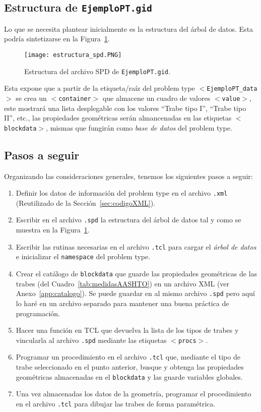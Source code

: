 \documentclass[10pt, a4paper, twocolumn]{article} %
\begin{document}
\subsection{Estructura de \texttt{EjemploPT.gid}}
Lo que se necesita plantear inicialmente es la estructura del árbol de datos. Esta podría sintetizarse en la Figura~\ref{fig:estructura_spd}.

\begin{figure}[hbt!]
	\centering
	\texttt{[image: estructura\_spd.PNG]}
	\caption{Estructura del archivo SPD de \texttt{EjemploPT.gid}.\label{fig:estructura_spd}}
\end{figure}

Esta expone que a partir de la etiqueta/raíz del problem type \texttt{$<$EjemploPT\_data$>$} se crea un \texttt{$<$container$>$} que almacene un cuadro de valores \texttt{$<$value$>$}, este mostrará una lista desplegable con los valores ``Trabe tipo I'', ``Trabe tipo II'', etc., las propiedades geométricas serán almancenadas en las etiquetas \texttt{$<$blockdata$>$}, mismas que fungirán como \textit{base de datos} del problem type.

\subsection{Pasos a seguir}

Organizando las consideraciones generales, tenemos los siguientes pasos a seguir:

\begin{enumerate}
	\item Definir los datos de información del problem type en el archivo \texttt{.xml} (Reutilizado de la Sección~\ref{sec:codigoXML}).
	\item Escribir en el archivo \texttt{.spd} la estructura del árbol de datos tal y como se muestra en la Figura~\ref{fig:estructura_spd}.
	\item Escribir las rutinas necesarias en el archivo \texttt{.tcl} para cargar el \textit{árbol de datos} e inicializar el \texttt{namespace} del problem type.
	\item Crear el catálogo de \texttt{blockdata} que guarde las propiedades geométricas de las trabes (del Cuadro~\ref{tab:medidasAASHTO}) en un archivo XML (ver Anexo~\ref{app:catalogo}). Se puede guardar en al mismo archivo \texttt{.spd} pero aquí lo haré en un archivo separado para mantener una buena práctica de programación.
	\item Hacer una función en TCL que devuelva la lista de los tipos de trabes y vincularla al archivo \texttt{.spd} mediante las etiquetas \texttt{$<$procs$>$}.
	\item Programar un procedimiento en el archivo \texttt{.tcl} que, mediante el tipo de trabe seleccionado en el punto anterior, busque y obtenga las propiedades geométricas almacenadas en el \texttt{blockdata} y las guarde variables globales.
	\item Una vez almacenadas los datos de la geometría, programar el procedimiento en el archivo \texttt{.tcl} para dibujar las trabes de forma paramétrica.
\end{enumerate}
\end{document}
